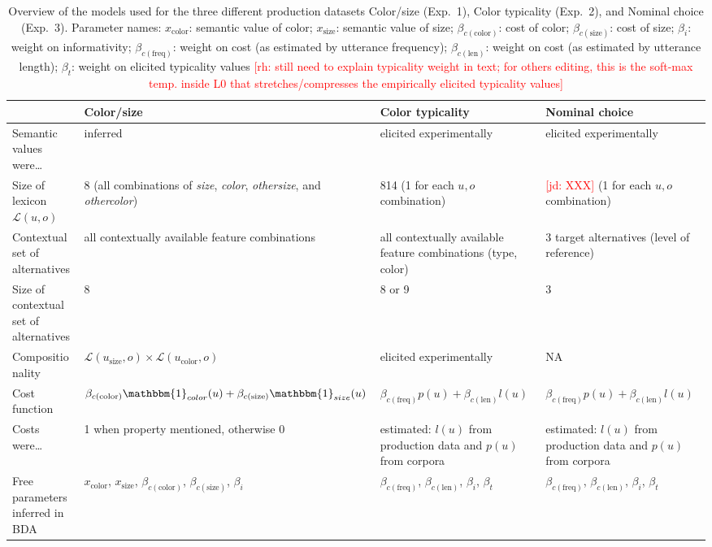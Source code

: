 \documentclass[11pt]{article}
\newcommand{\red}[1]{\textcolor{Red}{#1}}
\newcommand{\jd}[1]{\textcolor{Red}{[jd: #1]}}
\begin{document}
\begin{table}
\caption{Overview of the models used for the three different production datasets Color/size (Exp.~1), Color typicality (Exp.~2), and Nominal choice (Exp.~3). Parameter names:  $x_{\textrm{color}}$: semantic value of color; $x_{\textrm{size}}$: semantic value of size; $\beta_{c(\textrm{color})}$: cost of color;  $\beta_{c(\textrm{size})}$: cost of size; $\beta_i$: weight on informativity; $\beta_{c(\textrm{freq})}$: weight on cost (as estimated by utterance frequency); $\beta_{c(\textrm{len})}$: weight on cost (as estimated by utterance length); $\beta_t$: weight on elicited typicality values \red{[rh: still need to explain typicality weight in text; for others editing, this is the soft-max temp. inside L0 that stretches/compresses the empirically elicited typicality values]}
}
\begin{tabular}{p{4cm} p{3.9cm} p{3.9cm} p{3.9cm} }
\toprule
& Color/size & Color typicality & Nominal choice \\
\midrule
Semantic values were\dots & inferred & elicited experimentally & elicited experimentally\\
\midrule
Size of lexicon $\mathcal{L}(u,o)$  & 8 (all combinations of \emph{size}, \emph{color}, \emph{othersize}, and \emph{othercolor}) & 814 (1 for each $u,o$ combination) & \jd{XXX} (1 for each $u,o$ combination)\\
\midrule
Contextual set of alternatives & all contextually available feature combinations & all contextually available feature combinations (type, color) & 3 target alternatives (level of reference) \\
\midrule
Size of contextual set of alternatives & 8 & 8 or 9 & 3 \\
\midrule
Compositionality & $\mathcal{L}(u_{\text{size}},o) \times \mathcal{L}(u_{\text{color}},o)$ & elicited experimentally & NA \\
\midrule
Cost function & $\beta_{c(\textrm{color})}\mathbbm{1}_{color}(u)+\beta_{c(\textrm{size})}\mathbbm{1}_{size}(u)$ & $\beta_{c(\textrm{freq})}p(u) + \beta_{c(\textrm{len})}l(u)$ & $\beta_{c(\textrm{freq})}p(u) + \beta_{c(\textrm{len})}l(u)$ \\
\midrule
Costs were\dots & 1 when property mentioned, otherwise 0 & estimated: $l(u)$  from production data and $p(u)$  from corpora & estimated: $l(u)$  from production data and $p(u)$  from corpora \\
\midrule
Free parameters inferred in BDA & $x_{\textrm{color}}$, $x_{\textrm{size}}$, $\beta_{c(\textrm{color})}$,  $\beta_{c(\textrm{size})}$, $\beta_i$ & $\beta_{c(\textrm{freq})}$, $\beta_{c(\textrm{len})}$, $\beta_i$, $\beta_t$ & $\beta_{c(\textrm{freq})}$, $\beta_{c(\textrm{len})}$, $\beta_i$, $\beta_t$ \\
\midrule
\bottomrule
\end{tabular}
\label{tab:modeldiffs}
\end{table}
\end{document}
